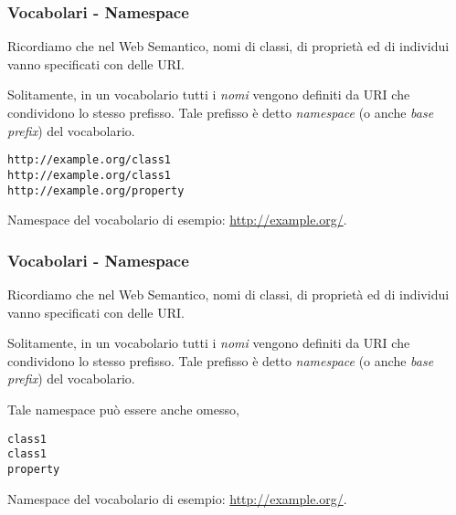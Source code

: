 \documentclass[8pt]{beamer}
\begin{document}
\begin{frame}[fragile]
\frametitle{Vocabolari - Namespace}

Ricordiamo che nel Web Semantico, nomi di classi, di propriet\`a ed di individui
vanno specificati con delle URI.
\vspace{\baselineskip}

Solitamente, in un vocabolario tutti i \emph{nomi} vengono definiti da URI che
condividono lo stesso prefisso. Tale prefisso \`e
detto \emph{namespace} (o anche \emph{base prefix}) del vocabolario.
\vspace{\baselineskip}

\phantom{
Tale namespace pu\`o essere anche omesso,
o abbreviato.
}

\begin{verbatim}
http://example.org/class1 
http://example.org/class1 
http://example.org/property 
\end{verbatim}
 
Namespace del vocabolario di esempio: \url{http://example.org/}.

\end{frame}

\begin{frame}[fragile]
\frametitle{Vocabolari - Namespace}

Ricordiamo che nel Web Semantico, nomi di classi, di propriet\`a ed di individui
vanno specificati con delle URI.
\vspace{\baselineskip}

Solitamente, in un vocabolario tutti i \emph{nomi} vengono definiti da URI che
condividono lo stesso prefisso. Tale prefisso \`e
detto \emph{namespace} (o anche \emph{base prefix}) del vocabolario.
\vspace{\baselineskip}

Tale namespace pu\`o essere anche omesso,
\phantom{
o abbreviato.
}

\begin{verbatim}
class1 
class1 
property 
\end{verbatim}
 
Namespace del vocabolario di esempio: \url{http://example.org/}.
\end{frame}
\end{document}
